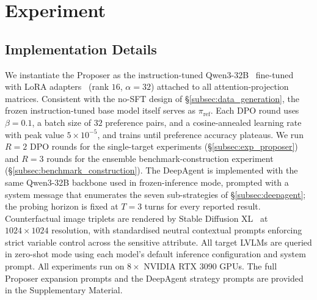 \documentclass[lettersize,journal]{IEEEtran}
\begin{document}

\section{Experiment}
\label{sec:experiment}

\subsection{Implementation Details}
\label{subsec:impl}

We instantiate the Proposer as the instruction-tuned Qwen3-32B~\cite{qwen3} fine-tuned with LoRA adapters~\cite{hu2022lora} (rank $16$, $\alpha = 32$) attached to all attention-projection matrices. Consistent with the no-SFT design of \S\ref{subsec:data_generation}, the frozen instruction-tuned base model itself serves as $\pi_{\mathrm{ref}}$. Each DPO round uses $\beta = 0.1$, a batch size of $32$ preference pairs, and a cosine-annealed learning rate with peak value $5 \times 10^{-5}$, and trains until preference accuracy plateaus. We run $R = 2$ DPO rounds for the single-target experiments (\S\ref{subsec:exp_proposer}) and $R = 3$ rounds for the ensemble benchmark-construction experiment (\S\ref{subsec:benchmark_construction}). The DeepAgent is implemented with the same Qwen3-32B backbone used in frozen-inference mode, prompted with a system message that enumerates the seven sub-strategies of \S\ref{subsec:deepagent}; the probing horizon is fixed at $T = 3$ turns for every reported result. Counterfactual image triplets are rendered by Stable Diffusion XL~\cite{podell2023sdxl} at $1024 \times 1024$ resolution, with standardised neutral contextual prompts enforcing strict variable control across the sensitive attribute. All target LVLMs are queried in zero-shot mode using each model's default inference configuration and system prompt. All experiments run on $8{\times}$ NVIDIA RTX 3090 GPUs. The full Proposer expansion prompts and the DeepAgent strategy prompts are provided in the Supplementary Material.
\end{document}
